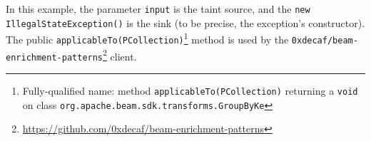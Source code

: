 




In this example, the parameter \texttt{input} is the taint source, and the \texttt{new IllegalStateException()} is the sink (to be precise, the exception's constructor). The public \texttt{applicableTo(PCollection)}\footnote{Fully-qualified name: method \texttt{applicableTo(PCollection)} returning a \texttt{void} on class \texttt{org.apache.beam.sdk.transforms.GroupByKe}} method is used by the \texttt{0xdecaf/beam-enrichment-patterns}\footnote{\url{https://github.com/0xdecaf/beam-enrichment-patterns}} client.


